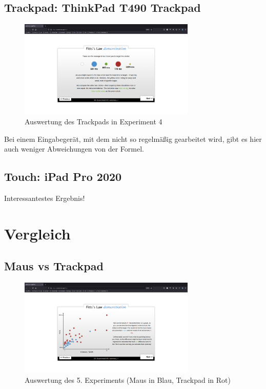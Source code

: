\documentclass{article}
\begin{document}
\subsection{Trackpad: ThinkPad T490 Trackpad}

\begin{figure}[h!]
	\centering
	\includegraphics[width=0.75\textwidth]{experiment-4-trackpad}
	\caption{Auswertung des Trackpads in Experiment 4}
\end{figure}

Bei einem Eingabegerät, mit dem nicht so regelmäßig gearbeitet wird,
gibt es hier auch weniger Abweichungen von der Formel.

\subsection{Touch: iPad Pro 2020}


Interessantestes Ergebnis!

\section{Vergleich}

\subsection{Maus vs Trackpad}

\begin{figure}[h!]
	\centering
	\includegraphics[width=0.75\textwidth]{experiment-5-maus-vs-trackpad}
	\caption{Auswertung des 5. Experiments (Maus in Blau, Trackpad in Rot)}
\end{figure}
\end{document}
